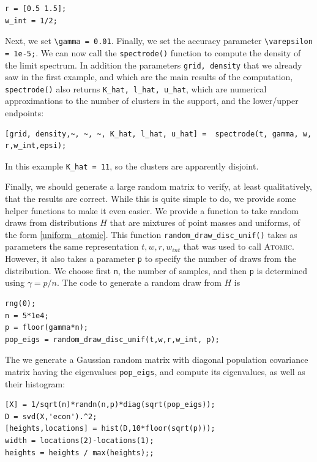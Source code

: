 \documentclass[english,11pt]{article} %
\begin{document}
\begin{verbatim}
r = [0.5 1.5];
w_int = 1/2;
\end{verbatim}

Next, we set \verb+\gamma = 0.01+. Finally, we set the accuracy parameter \verb+\varepsilon = 1e-5;+. We can now call the \verb+spectrode()+ function to compute the density of the limit spectrum. In addition the parameters  \verb+grid, density+ that we already saw in the first example, and which are the main results of the computation,  \verb+spectrode()+ also returns \verb+K_hat, l_hat, u_hat+, which are numerical approximations to the number of clusters in the support, and the lower/upper endpoints:


\begin{verbatim}
[grid, density,~, ~, ~, K_hat, l_hat, u_hat] =  spectrode(t, gamma, w, r,w_int,epsi);
\end{verbatim}

In this example \verb+K_hat = 11+, so the clusters are apparently disjoint. 

Finally, we should generate a large random matrix to verify, at least qualitatively, that the results are correct. While this is quite simple to do, we provide some helper functions to make it even easier. We provide a function to take random draws from distributions $H$ that are mixtures of point masses and uniforms, of the form \ref{uniform_atomic}. This function \verb+random_draw_disc_unif()+ takes as parameters the same representation $t,w,r,w_{int}$ that was used to call \textsc{Atomic}. However, it also takes a parameter \verb+p+ to specify the number of draws from the distribution. We choose first \verb+n+, the number of samples, and then \verb+p+ is determined using $\gamma = p/n$. The code to generate a random draw from $H$ is

\begin{verbatim}
rng(0);
n = 5*1e4;
p = floor(gamma*n);
pop_eigs = random_draw_disc_unif(t,w,r,w_int, p);
\end{verbatim}

The we generate a Gaussian random matrix with diagonal population covariance matrix having the eigenvalues \verb+pop_eigs+, and compute its eigenvalues, as well as their histogram:  

\begin{verbatim}
[X] = 1/sqrt(n)*randn(n,p)*diag(sqrt(pop_eigs));
D = svd(X,'econ').^2;
[heights,locations] = hist(D,10*floor(sqrt(p)));
width = locations(2)-locations(1);
heights = heights / max(heights);;
\end{verbatim}
\end{document}

